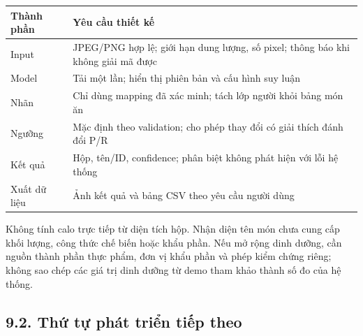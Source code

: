 \documentclass[
  vietnamese,
  12pt,
  a4paper,
]{article}
\newcounter{none} %
\begin{document}
{\def\LTcaptype{none} %
\begin{longtable}[]{@{}
  >{\raggedright\arraybackslash}p{}
  >{\raggedright\arraybackslash}p{}@{}}
\toprule\noalign{}
\begin{minipage}[b]{\linewidth}\raggedright
Thành phần
\end{minipage} & \begin{minipage}[b]{\linewidth}\raggedright
Yêu cầu thiết kế
\end{minipage} \\
\midrule\noalign{}
\endhead
\bottomrule\noalign{}
\endlastfoot
Input & JPEG/PNG hợp lệ; giới hạn dung lượng, số pixel; thông báo khi
không giải mã được \\
Model & Tải một lần; hiển thị phiên bản và cấu hình suy luận \\
Nhãn & Chỉ dùng mapping đã xác minh; tách lớp người khỏi bảng món ăn \\
Ngưỡng & Mặc định theo validation; cho phép thay đổi có giải thích đánh
đổi P/R \\
Kết quả & Hộp, tên/ID, confidence; phân biệt không phát hiện với lỗi hệ
thống \\
Xuất dữ liệu & Ảnh kết quả và bảng CSV theo yêu cầu người dùng \\
\end{longtable}
}

\endgroup

Không tính calo trực tiếp từ diện tích hộp. Nhận diện tên món chưa cung
cấp khối lượng, công thức chế biến hoặc khẩu phần. Nếu mở rộng dinh
dưỡng, cần nguồn thành phần thực phẩm, đơn vị khẩu phần và phép kiểm
chứng riêng; không sao chép các giá trị dinh dưỡng từ demo tham khảo
thành số đo của hệ thống.

\subsection{9.2. Thứ tự phát triển tiếp
theo}\label{thux1ee9-tux1ef1-phuxe1t-triux1ec3n-tiux1ebfp-theo}
\end{document}
